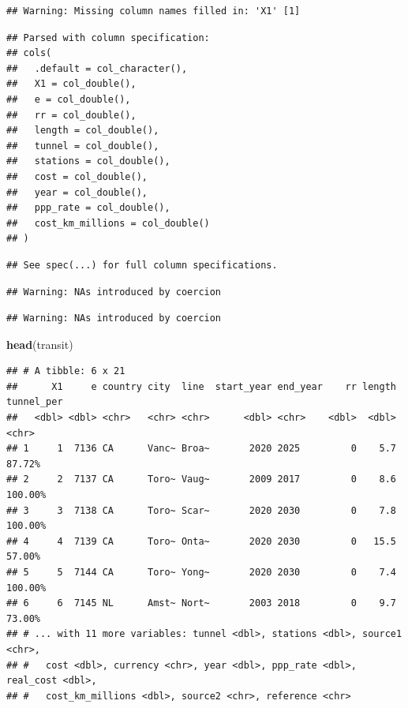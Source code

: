 \documentclass[]{article}
\newenvironment{Shaded}{\begin{snugshade}}{\end{snugshade}}
\newcommand{\CommentTok}[1]{\textcolor[rgb]{0.56,0.35,0.01}{\textit{#1}}}
\newcommand{\KeywordTok}[1]{\textcolor[rgb]{0.13,0.29,0.53}{\textbf{#1}}}
\newcommand{\NormalTok}[1]{#1}
\begin{document}
\begin{verbatim}
## Warning: Missing column names filled in: 'X1' [1]
\end{verbatim}

\begin{verbatim}
## Parsed with column specification:
## cols(
##   .default = col_character(),
##   X1 = col_double(),
##   e = col_double(),
##   rr = col_double(),
##   length = col_double(),
##   tunnel = col_double(),
##   stations = col_double(),
##   cost = col_double(),
##   year = col_double(),
##   ppp_rate = col_double(),
##   cost_km_millions = col_double()
## )
\end{verbatim}

\begin{verbatim}
## See spec(...) for full column specifications.
\end{verbatim}

\begin{verbatim}
## Warning: NAs introduced by coercion
\end{verbatim}

\begin{verbatim}
## Warning: NAs introduced by coercion
\end{verbatim}

\begin{Shaded}
\end{Shaded}

\begin{Shaded}
\begin{Highlighting}[]
\KeywordTok{head}\NormalTok{(transit)}
\end{Highlighting}
\end{Shaded}

\begin{verbatim}
## # A tibble: 6 x 21
##      X1     e country city  line  start_year end_year    rr length tunnel_per
##   <dbl> <dbl> <chr>   <chr> <chr>      <dbl> <chr>    <dbl>  <dbl> <chr>     
## 1     1  7136 CA      Vanc~ Broa~       2020 2025         0    5.7 87.72%    
## 2     2  7137 CA      Toro~ Vaug~       2009 2017         0    8.6 100.00%   
## 3     3  7138 CA      Toro~ Scar~       2020 2030         0    7.8 100.00%   
## 4     4  7139 CA      Toro~ Onta~       2020 2030         0   15.5 57.00%    
## 5     5  7144 CA      Toro~ Yong~       2020 2030         0    7.4 100.00%   
## 6     6  7145 NL      Amst~ Nort~       2003 2018         0    9.7 73.00%    
## # ... with 11 more variables: tunnel <dbl>, stations <dbl>, source1 <chr>,
## #   cost <dbl>, currency <chr>, year <dbl>, ppp_rate <dbl>, real_cost <dbl>,
## #   cost_km_millions <dbl>, source2 <chr>, reference <chr>
\end{verbatim}
\end{document}

